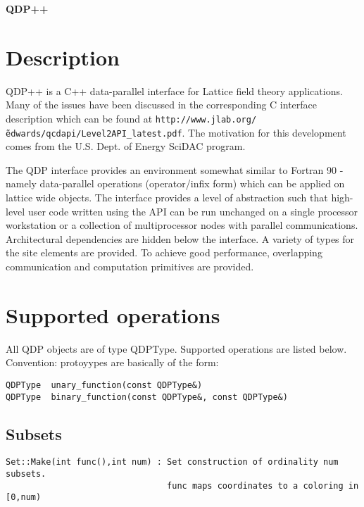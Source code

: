 \documentclass[12pt,letterpaper]{article}
\begin{document}
\pagestyle{empty} 
\begin{center}
{\bfseries\large QDP++}
\end{center}
\bigskip

\date{Sept. 25, 2002}

\section{Description}

QDP++ is a C++ data-parallel interface for Lattice field theory
applications. Many of the issues have been discussed in the
corresponding C interface description which can be found at
{\tt http://www.jlab.org/\~edwards/qcdapi/Level2API\_latest.pdf}. The
motivation for this development comes from the U.S. Dept. of Energy
SciDAC program.

The QDP interface provides an environment somewhat similar to 
Fortran 90 - namely data-parallel operations (operator/infix form)
which can be applied on lattice wide objects. The interface provides a
level of abstraction such that high-level user code written using the
API can be run unchanged on a single processor workstation or a
collection of multiprocessor nodes with parallel communications.
Architectural dependencies are hidden below the interface. A variety
of types for the site elements are provided. To achieve good
performance, overlapping communication and computation primitives are
provided.

\medskip

\section{Supported operations}

All QDP objects are of type QDPType. Supported operations are listed below.
Convention: protoyypes are basically of the form:

\begin{verbatim}
QDPType  unary_function(const QDPType&)
QDPType  binary_function(const QDPType&, const QDPType&)
\end{verbatim}

\medskip

\subsection{Subsets}
\label{sec:subsets}

\begin{verbatim}
Set::Make(int func(),int num) : Set construction of ordinality num subsets.
                                func maps coordinates to a coloring in [0,num)
\end{verbatim}
\end{document}
